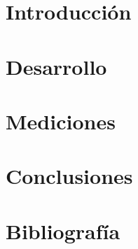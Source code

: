 \documentclass[a4paper,10pt]{article}
\begin{document}

\newpage
\tableofcontents
\newpage


\section{Introducción} 
\label{sec:intro}

\section{Desarrollo}
\label{sec:desarrollo}
%

\section{Mediciones}
\label{sec:mediciones}
%

\section{Conclusiones}
\label{sec:conclusiones}
%


\section{Bibliografía}
\end{document}
